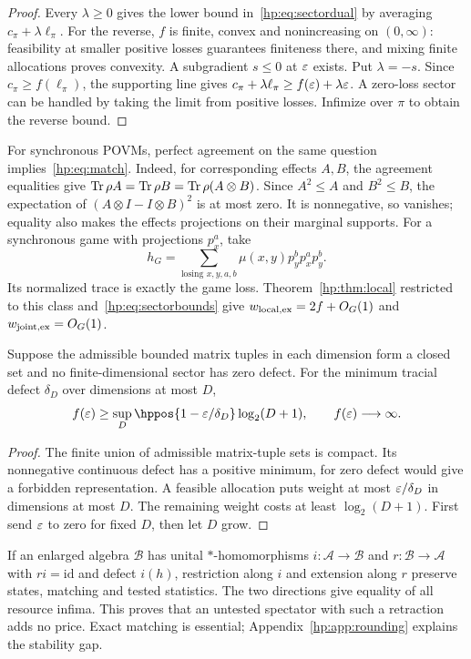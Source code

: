 \begin{proof}
Every $\lambda\ge0$ gives the lower bound in~\eqref{hp:eq:sectordual} by averaging $c_\pi+\lambda\ell_\pi$. For the reverse, $f$ is finite, convex and nonincreasing on $(0,\infty)$: feasibility at smaller positive losses guarantees finiteness there, and mixing finite allocations proves convexity. A subgradient $s\le0$ at $\varepsilon$ exists. Put $\lambda=-s$. Since $c_\pi\ge f(\ell_\pi)$, the supporting line gives $c_\pi+\lambda\ell_\pi\ge f(\varepsilon)+\lambda\varepsilon$. A zero-loss sector can be handled by taking the limit from positive losses. Infimize over $\pi$ to obtain the reverse bound.
\end{proof}

For synchronous POVMs, perfect agreement on the same question implies~\eqref{hp:eq:match}. Indeed, for corresponding effects $A,B$, the agreement equalities give $\operatorname{Tr}\rho A=\operatorname{Tr}\rho B=\operatorname{Tr}\rho(A\otimes B)$. Since $A^2\le A$ and $B^2\le B$, the expectation of $(A\otimes I-I\otimes B)^2$ is at most zero. It is nonnegative, so vanishes; equality also makes the effects projections on their marginal supports. For a synchronous game with projections $p_x^a$, take
\[
 h_G=\sum_{\text{losing }x,y,a,b}\mu(x,y)p_y^bp_x^ap_y^b.
\]
Its normalized trace is exactly the game loss. Theorem~\ref{hp:thm:local} restricted to this class and~\eqref{hp:eq:sectorbounds} give $w_{\rm local,ex}=2f+O_G(1)$ and $w_{\rm joint,ex}=O_G(1)$.

\begin{corollary}\label{hp:cor:compact}
Suppose the admissible bounded matrix tuples in each dimension form a closed set and no finite-dimensional sector has zero defect. For the minimum tracial defect $\delta_D$ over dimensions at most $D$,
\[
 f(\eps)\ge\sup_D\hppos{1-\eps/\delta_D}\log_2(D+1),
 \qquad f(\eps)\longrightarrow\infty.
\]
\end{corollary}
\begin{proof}
The finite union of admissible matrix-tuple sets is compact. Its nonnegative continuous defect has a positive minimum, for zero defect would give a forbidden representation. A feasible allocation puts weight at most $\varepsilon/\delta_D$ in dimensions at most $D$. The remaining weight costs at least $\log_2(D+1)$. First send $\varepsilon$ to zero for fixed $D$, then let $D$ grow.
\end{proof}

If an enlarged algebra $\mathcal B$ has unital $*$-homomorphisms $i:\mathcal A\to\mathcal B$ and $r:\mathcal B\to\mathcal A$ with $ri=\mathrm{id}$ and defect $i(h)$, restriction along $i$ and extension along $r$ preserve states, matching and tested statistics. The two directions give equality of all resource infima. This proves that an untested spectator with such a retraction adds no price. Exact matching is essential; Appendix~\ref{hp:app:rounding} explains the stability gap.
